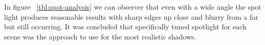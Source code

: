 In figure ~\ref{tbl:spot-analysis} we can observer that even with a wide angle the spot light produces reasonable results with sharp edges up close and blurry from a far but still occurring. It was concluded that specifically tuned spotlight for each scene was the approach to use for the most realistic shadows.